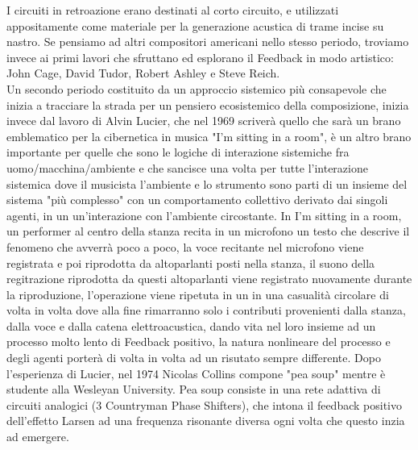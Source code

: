 I circuiti in retroazione erano destinati al corto circuito,
e utilizzati appositamente come materiale per la generazione acustica
di trame incise su nastro.
Se pensiamo ad altri compositori americani nello stesso periodo,
troviamo invece ai primi lavori che sfruttano
ed esplorano il Feedback in modo artistico:
John Cage, David Tudor, Robert Ashley e Steve Reich. \\
Un secondo periodo costituito da un approccio sistemico più consapevole
che inizia a tracciare la strada per un pensiero ecosistemico della composizione,
inizia invece dal lavoro
di Alvin Lucier, che nel 1969 scriverà quello che sarà un brano emblematico per
la cibernetica in musica "I'm sitting in a room",
è un altro brano importante per quelle che sono
le logiche di interazione sistemiche fra uomo/macchina/ambiente
e che sancisce una volta per tutte
l'interazione sistemica dove il musicista l'ambiente e lo strumento sono parti di un insieme del sistema "più complesso" con un comportamento collettivo derivato dai singoli agenti,
in un un'interazione con l'ambiente circostante.
In I'm sitting in a room, un performer al centro della stanza
recita in un microfono un testo che descrive il fenomeno che avverrà poco a poco,
la voce recitante nel microfono viene registrata e poi riprodotta da altoparlanti
posti nella stanza, il suono della regitrazione riprodotta da questi altoparlanti
viene registrato nuovamente durante la riproduzione, l'operazione
viene ripetuta in un in una casualità circolare di volta in volta dove alla fine rimarranno
solo i contributi provenienti dalla stanza, dalla voce e dalla catena elettroacustica,
dando vita nel loro insieme ad un processo molto lento di Feedback positivo,
la natura nonlineare del processo e degli agenti porterà di volta in volta ad un risutato
sempre differente.
Dopo l'esperienza di Lucier, nel 1974 Nicolas Collins compone "pea soup"
mentre è studente alla Wesleyan University.
Pea soup consiste in una rete adattiva di circuiti analogici (3 Countryman Phase Shifters),
che intona il feedback positivo dell'effetto Larsen ad una frequenza risonante diversa
ogni volta che questo inzia ad emergere.


